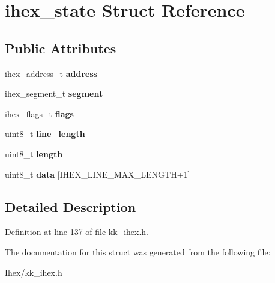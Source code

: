 \hypertarget{structihex__state}{}\section{ihex\+\_\+state Struct Reference}
\label{structihex__state}
\subsection*{Public Attributes}
\begin{DoxyCompactItemize}
\item 
\mbox{\label{structihex__state_a9cc461afa988207dafad8afe725db1b1}} 
ihex\+\_\+address\+\_\+t {\bfseries address}
\item 
\mbox{\label{structihex__state_acfbea6364533c927b628eb474ce00cea}} 
ihex\+\_\+segment\+\_\+t {\bfseries segment}
\item 
\mbox{\label{structihex__state_a8cb48da1ec3d3c10e76b9158e7469c02}} 
ihex\+\_\+flags\+\_\+t {\bfseries flags}
\item 
\mbox{\label{structihex__state_aabb6bfa39fe9e5bb3d7a6f86bed00e66}} 
uint8\+\_\+t {\bfseries line\+\_\+length}
\item 
\mbox{\label{structihex__state_a162a137dee12a7fa298404a1826b3aa8}} 
uint8\+\_\+t {\bfseries length}
\item 
\mbox{\label{structihex__state_acd267d08d8f995296350b114e99d8e58}} 
uint8\+\_\+t {\bfseries data} \mbox{[}I\+H\+E\+X\+\_\+\+L\+I\+N\+E\+\_\+\+M\+A\+X\+\_\+\+L\+E\+N\+G\+TH+1\mbox{]}
\end{DoxyCompactItemize}


\subsection{Detailed Description}


Definition at line 137 of file kk\+\_\+ihex.\+h.



The documentation for this struct was generated from the following file\+:\begin{DoxyCompactItemize}
\item 
Ihex/kk\+\_\+ihex.\+h\end{DoxyCompactItemize}
